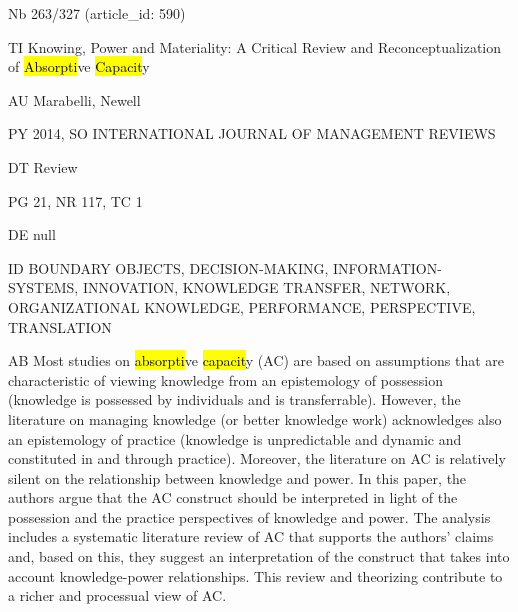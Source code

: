 \documentclass[a4paper]{article}
\begin{document}
\vspace*{-2cm}
Nb \tabto{0cm}263/327 (article\_id: 590)\par
TI \tabto{0cm}Knowing, Power and Materiality: A Critical Review and Reconceptualization of \hl{Absorpti}ve \hl{Capacit}y\par
AU \tabto{0cm}Marabelli, Newell\par
PY \tabto{0cm}2014, SO INTERNATIONAL JOURNAL OF MANAGEMENT REVIEWS\par
DT \tabto{0cm}Review\par
PG \tabto{0cm}21, NR 117, TC 1\par
DE \tabto{0cm}null\par
ID \tabto{0cm}BOUNDARY OBJECTS, DECISION-MAKING, INFORMATION-SYSTEMS, INNOVATION, KNOWLEDGE TRANSFER, NETWORK, ORGANIZATIONAL KNOWLEDGE, PERFORMANCE, PERSPECTIVE, TRANSLATION\par
AB \tabto{0cm}Most studies on \hl{absorpti}ve \hl{capacit}y (AC) are based on assumptions that are characteristic of viewing knowledge from an epistemology of possession (knowledge is possessed by individuals and is transferrable). However, the literature on managing knowledge (or better knowledge work) acknowledges also an epistemology of practice (knowledge is unpredictable and dynamic and constituted in and through practice). Moreover, the literature on AC is relatively silent on the relationship between knowledge and power. In this paper, the authors argue that the AC construct should be interpreted in light of the possession and the practice perspectives of knowledge and power. The analysis includes a systematic literature review of AC that supports the authors' claims and, based on this, they suggest an interpretation of the construct that takes into account knowledge-power relationships. This review and theorizing contribute to a richer and processual view of AC.\par
\clearpage
\end{document}
